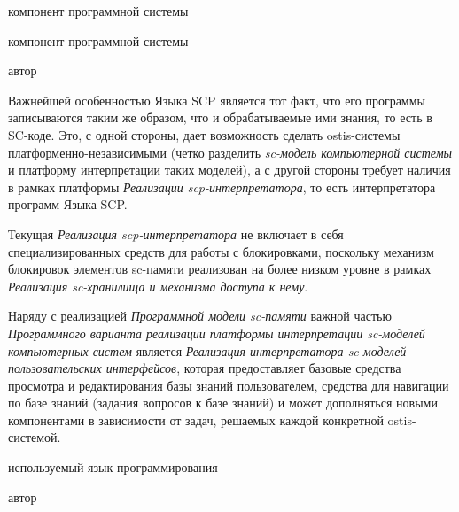 \begin{scnitemize}
\begin{scnitemize}
\begin{SCn}
\begin{scnrelfromlist}{компонент программной системы}
\begin{scnindent}
\begin{scnrelfromlist}{компонент программной системы}
        \end{scnrelfromlist}
    \end{scnindent}
\end{scnrelfromlist}
\begin{scnrelfromlist}{автор}
\end{scnrelfromlist}
\end{SCn}

Важнейшей особенностью Языка SCP является тот факт, что его программы записываются таким же образом, что и обрабатываемые
ими знания, то есть в SC-коде. Это, с одной стороны, дает возможность сделать ostis-системы платформенно-независимыми
(четко разделить \textit{sc-модель компьютерной системы} и платформу интерпретации таких моделей), а с другой стороны
требует наличия в рамках платформы \textit{Реализации scp-интерпретатора}, то есть интерпретатора программ Языка SCP.

Текущая \textit{Реализация scp-интерпретатора} не включает в себя специализированных средств для работы с блокировками,
поскольку механизм блокировок элементов sc-памяти реализован на более низком уровне в рамках \textit{Реализация
sc-хранилища и механизма доступа к нему}.

Наряду с реализацией \textit{Программной модели sc-памяти} важной частью \textit{Программного варианта реализации платформы
интерпретации sc-моделей компьютерных систем} является \textit{Реализация интерпретатора sc-моделей пользовательских
интерфейсов}, которая предоставляет базовые средства просмотра и редактирования базы знаний пользователем, средства для
навигации по базе знаний (задания вопросов к базе знаний) и может дополняться новыми компонентами в зависимости от задач,
решаемых каждой конкретной ostis-системой.

\begin{SCn}
\begin{scnrelfromlist}{используемый язык программирования}
\end{scnrelfromlist}
\begin{scnrelfromlist}{автор}
\end{scnrelfromlist}
\end{SCn}


\end{scnitemize}
\end{scnitemize}
